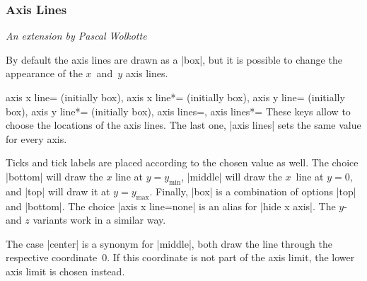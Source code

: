 \subsubsection{Axis Lines}

{\small \emph{An extension by Pascal Wolkotte}}
\vspace{0.4cm}%

\label{sec:pgfplots:axislines}
\noindent By default the axis lines are drawn as a |box|, but it is possible to change the appearance of the $x$~and~$y$ axis lines.

\begin{pgfplotskeylist}{
	axis x line= (initially box),
	axis x line*= (initially box),
	axis y line= (initially box),
	axis y line*= (initially box),
	axis lines=,
	axis lines*=}
	These keys allow to choose the locations of the axis lines. The last one, |axis lines| sets the same value for every axis.

Ticks and tick labels are placed according to the chosen value as well.
The choice |bottom| will draw the $x$ line at $y=y_{\text{min}}$, |middle| will draw the $x$~line at $y=0$, and |top| will draw it at $y=y_{\text{max}}$. Finally, |box| is a combination of options |top| and |bottom|. The choice |axis x line=none| is an alias for |hide x axis|. The $y$- and $z$ variants work in a similar way. 

The case |center| is a synonym for |middle|, both draw the line through the respective coordinate~$0$. If this coordinate is not part of the axis limit, the lower axis limit is chosen instead.



\end{pgfplotskeylist}
